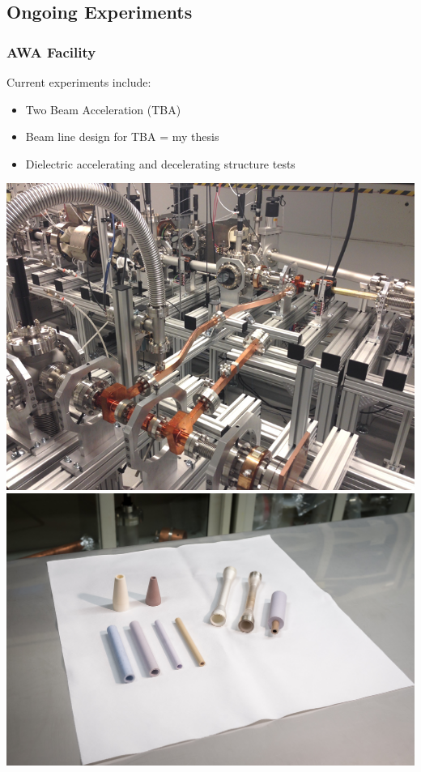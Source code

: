 \documentclass[professionalfonts,t]{beamer}
\begin{document}
\subsection{Ongoing Experiments}
\begin{frame}[t]
	\frametitle{AWA Facility}
	\vspace{-1em}
	Current experiments include:
	\begin{itemize}
		\item{Two Beam Acceleration (TBA)}
		\item{Beam line design for TBA = my thesis}
		\item{Dielectric accelerating and decelerating structure tests}	
	\end{itemize}
    \vspace{1em}
	\includegraphics[width=0.5\linewidth, trim={0 0 0 1.65cm},clip]{../images/stage}\hfill%
	\includegraphics[width=0.5\linewidth]{../images/dielectrics}	
\end{frame}
\end{document}
